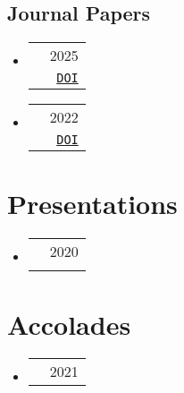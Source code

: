 \documentclass[letterpaper,11pt]{article}
\makeatletter
\newcommand{\resumeSubHeadingListStart}{\begin{itemize}[leftmargin=*]}
\newcommand{\resumeSubHeadingListEnd}{\end{itemize}}
\newcommand{\resumeSubheading}[4]{%
  \item[]%
  \begin{tabularx}{\textwidth}{>{\raggedright\arraybackslash}X@{\hspace{0.5em}}r}
    {\bfseries{\textsc{#1}}} & #2 \\[2pt]
    {\small #3}               & {\small #4} \\
  \end{tabularx}%
}
\newcommand{\resumeOneLine}[2]{%
  \item[]%
  \begin{tabularx}{\textwidth}{>{\raggedright\arraybackslash}X@{\hspace{0.5em}}r}
    {\bfseries{\textsc{#1}}} & {\small #2} \\
  \end{tabularx}\vspace{-6pt}%
}
\newcommand{\pdficon}{\faFilePdf}
\newcommand{\doilabel}{\texttt{DOI}}
\makeatother
\begin{document}
    \subsection*{Journal Papers}\vspace{-1em}%
    \resumeSubHeadingListStart
        \resumeSubheading
          {Minimum Plane Bichromatic Spanning Trees}
          {2025}
          {ACM Transactions on Algorithms (Transactions on Algorithms)}
          {%
\href{https://dl.acm.org/doi/pdf/10.1145/3747591}{\pdficon}%
%
\quad\href{https://doi.org/10.1145/3747591}{\doilabel}%
          }\vspace{0.35em}
        \resumeSubheading
          {Physical Visitor Access Control and Authentication Using Blockchain, Smart Contracts and Internet of Things}
          {2022}
          {Cryptography (MDPI), Special Issue on Emerging Topics in Blockchain Security and Privacy (Cryptography)}
          {%
\href{https://www.mdpi.com/2410-387X/6/4/65}{\pdficon}%
%
\quad\href{https://doi.org/10.3390/cryptography6040065}{\doilabel}%
          }\vspace{0.35em}
    \resumeSubHeadingListEnd

\section{Presentations}
\resumeSubHeadingListStart
  \resumeSubheading
    {}
    {2020}
    { ()}
    {%
\href{tba/docstore/talks/slides.pdf}{\pdficon}%
%
    }
\resumeSubHeadingListEnd

\section{Accolades}
\resumeSubHeadingListStart
  \resumeOneLine{Magnum Cum Laude}{2021}
\resumeSubHeadingListEnd
\end{document}

